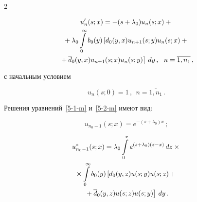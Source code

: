 \begin{multicols}{2}
\noindent


\begin{multline*}


u'_n(s;x) = - (s + \lambda_0) u_{n}(s;x) +{}\\


{}+


\lambda_0 \int\limits_0^\infty b_0(y) \left[d_0(y,x) u_{n+1}(s;y) u_{n}(s;x)


+{}\right.\\


\left.{}+\d_0(y,x) u_{n+1}(s;x) u_{n}(s;y)\right] \, dy\,,


\ \ n=\overline{1,n_1}\,,


\end{multline*}




с начальным условием


$$


u_n(s;0)= 1 \,,


\ \ n=\overline{1,n_1}\,.


$$





Решения уравнений~\eqref{5-1-m} и~\eqref{5-2-m} имеют вид:




$$


u_{n_0-1}(s;x)= e^{-(s + \lambda_0) x}\,;


$$







\vspace*{-12pt}





\noindent


\begin{multline}


\label{5-2-4-m}


u^*_{n_0-1}(s;x) = \lambda_0 \int\limits_0^x e^{(s + \lambda_0) (z-x)}\, dz\times{}\\


{}\times \int\limits_0^\infty b_0(y) \left[d_0(y,z) u(s;y) u(s;z)+{}\right.\\


\left.{}+


\d_0(y,z) u(s;z) u(s;y)\right] \, dy\,.


\end{multline}



\end{multicols}
